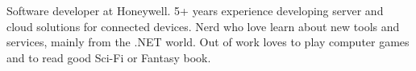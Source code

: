 

\begin{cvparagraph}

Software developer at Honeywell. 5+ years experience developing server and cloud
solutions for connected devices. Nerd who love learn about new tools and services,
mainly from the .NET world. Out of work loves to play computer games and to read
good Sci-Fi or Fantasy book.
\end{cvparagraph}
